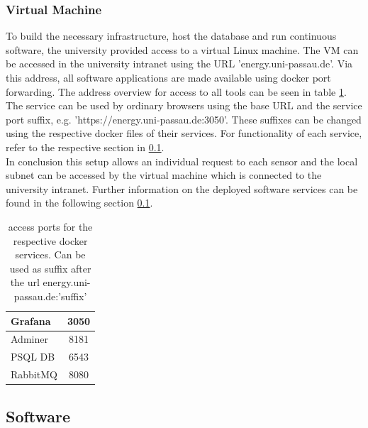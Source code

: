 \subsubsection{Virtual Machine}
To build the necessary infrastructure, host the database and run continuous software, the university provided access to a virtual Linux machine. The VM can be accessed in the university intranet using the URL 'energy.uni-passau.de'. Via this address, all software applications are made available using docker port forwarding. The address overview for access to all tools can be seen in table \ref{tab:access}. The service can be used by ordinary browsers using the base URL and the service port suffix, e.g. 'https://energy.uni-passau.de:3050'. These suffixes can be changed using the respective docker files of their services. For functionality of each service, refer to the respective section in \ref{subsec:software}.\\
In conclusion this setup allows an individual request to each sensor and the local subnet can be accessed by the virtual machine which is connected to the university intranet. Further information on the deployed software services can be found in the following section \ref{subsec:software}.
\begin{table}
\centering
\begin{tabular}{l|c}
	\hline
	Grafana & 3050 \\ \hline
	Adminer & 8181 \\ \hline
	PSQL DB & 6543 \\ \hline
	RabbitMQ & 8080
\end{tabular}
\caption{access ports for the respective docker services. Can be used as suffix after the url energy.uni-passau.de:'suffix'}
\label{tab:access}
\end{table}
\subsection{Software}\label{subsec:software}

